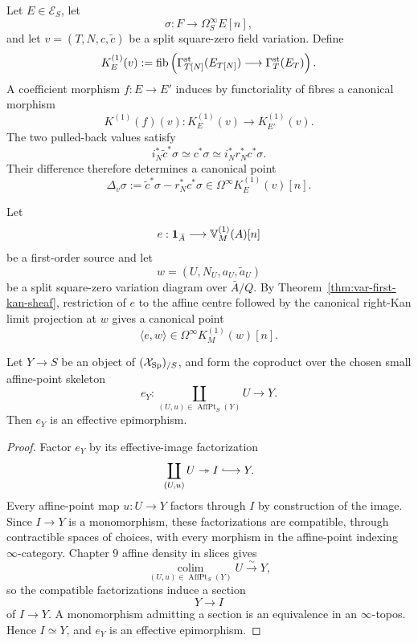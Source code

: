 \begin{definition}
\label{def:var-big-first-difference}
Let \(E\in\mathcal E_S\), let
\[
    \sigma:F\longrightarrow\Omega_S^\infty E[n],
\]
and let \(v=(T,N,c,\widetilde c)\) be a split square-zero field variation. Define
\[
    K_E^{(1)}(v)
    :=
    \operatorname{fib}\left(
      \Gamma_{T[N]}^{\mathrm{st}}(E_{T[N]})
      \longrightarrow
      \Gamma_T^{\mathrm{st}}(E_T)
    \right).
\]
A coefficient morphism \(f:E\to E'\) induces by functoriality of fibres a canonical morphism
\[
    K^{(1)}(f)(v):
    K_E^{(1)}(v)\longrightarrow K_{E'}^{(1)}(v).
\]
The two pulled-back values satisfy
\[
    i_N^*\widetilde c^*\sigma
    \simeq
    c^*\sigma
    \simeq
    i_N^*r_N^*c^*\sigma.
\]
Their difference therefore determines a canonical point
\[
    \boxed{
    \Delta_v\sigma
    :=
    \widetilde c^*\sigma-r_N^*c^*\sigma
    \in
    \Omega^\infty K_E^{(1)}(v)[n].
    }
\]
\end{definition}

\begin{definition}
\label{def:var-euler-evaluation-on-variation}
Let
\[
    e:\mathbf 1_{\bar A}\longrightarrow\mathbb V^{(1)}_M(A)[n]
\]
be a first-order source and let
\[
    w=(U,N_U,a_U,\widetilde a_U)
\]
be a split square-zero variation diagram over \(\bar A/Q\). By Theorem~\ref{thm:var-first-kan-sheaf}, restriction of \(e\) to the affine centre followed by the canonical right-Kan limit projection at \(w\) gives a canonical point
\[
    \boxed{
    \langle e,w\rangle
    \in
    \Omega^\infty K_M^{(1)}(w)[n].
    }
\]
\end{definition}

\begin{lemma}
\label{lem:var-affine-point-effective-epi}
Let \(Y\to S\) be an object of \((\mathcal{X}_{\mathrm{Sp}})_{/S}\), and form the coproduct over the chosen small affine-point skeleton
\[
    e_Y:
    \coprod_{(U,u)\in\operatorname{AffPt}_S(Y)}
    U
    \longrightarrow
    Y.
\]
Then \(e_Y\) is an effective epimorphism.
\end{lemma}

\begin{proof}
Factor \(e_Y\) by its effective-image factorization
\[
    \coprod_{(U,u)}U
    \twoheadrightarrow
    I
    \lhook\joinrel\longrightarrow
    Y.
\]
Every affine-point map \(u:U\to Y\) factors through \(I\) by construction of the image. Since \(I\to Y\) is a monomorphism, these factorizations are compatible, through contractible spaces of choices, with every morphism in the affine-point indexing \(\infty\)-category. Chapter 9 affine density in slices gives
\[
    \operatorname*{colim}_{(U,u)\in\operatorname{AffPt}_S(Y)}
    U
    \xrightarrow{\sim}
    Y,
\]
so the compatible factorizations induce a section
\[
    Y\longrightarrow I
\]
of \(I\to Y\). A monomorphism admitting a section is an equivalence in an \(\infty\)-topos. Hence \(I\simeq Y\), and \(e_Y\) is an effective epimorphism.
\end{proof}

